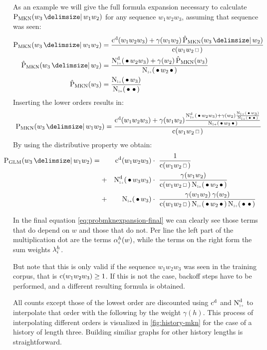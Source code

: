 As an example we will give the full formula expansion necessary to calculate
$\ProbMKN{w_3}{w_1 w_2}$ for any sequence $w_1 w_2 w_3$, assuming that sequence
was seen:
\begin{subequations}
  \begin{align}
    \ProbMKN {w_3}{w_1 w_2} &= \ProbMKNcab{\ProbMKN*{w_3}{w_2}} \\
    \ProbMKN*{w_3}{w_2}     &= \ProbMKNcb{\ProbMKN*{w_3}} \\
    \ProbMKN*{w_3}          &= \ProbMKNc
  \end{align}
\end{subequations}
Inserting the lower orders results in:
\begin{equation}
  \ProbMKN {w_3}{w_1 w_2} = \ProbMKNcab{\ProbMKNcb{\ProbMKNc}}
\end{equation}
By using the distributive property we obtain:
\begin{align}
  \label{eq:probmknexpansion-final}
  \hspace{-2.5em}\ProbGLM {w_3}{w_1 w_2} = {}
    & & \DiscountedCount (w_1 w_2 w_3)   & \cdot\ \frac{1}{\Count(w_1 w_2 \Skp)} \\
    &+& \DiscountedCount*(\WSkp w_3 w_3) & \cdot\ \frac{\gamma(w_1 w_2)}{\Count(w_1 w_2 \Skp) \ContCountIp(\WSkp w_2 \WSkp)} \nonumber \\
    &+& \ContCountIp(\WSkp w_3)          & \cdot\ \frac{\gamma(w_1 w_2) \: \gamma(w_2)}{\Count(w_1 w_2 \Skp) \ContCountIp(\WSkp w_2 \WSkp) \ContCountIp(\WSkp \WSkp)} \nonumber
\end{align}

In the final equation \cref{eq:probmknexpansion-final} we can clearly see
those terms that do depend on $w$ and those that do not.
Per line the left part of the multiplication dot are the terms $\alpha^h_i(w)$,
while the terms on the right form the sum weights $\lambda^h_i$.

But note that this is only valid if the sequence $w_1 w_2 w_3$ was seen in
the training corpus, that is $\operatorname{c}(w_1 w_2 w_3) \geq 1$.
If this is not the case, backoff steps have to be performed, and a different
resulting formula is obtained.

All counts except those of the lowest order are discounted using
$\DiscountedCount$ and $\DiscountedCount*$ to interpolate that order with the
following by the weight $\gamma(h)$.
This process of interpolating different orders is visualized in
\cref{fig:history-mkn} for the case of a history of length three.
Building similiar graphs for other history lengths is straightforward.

